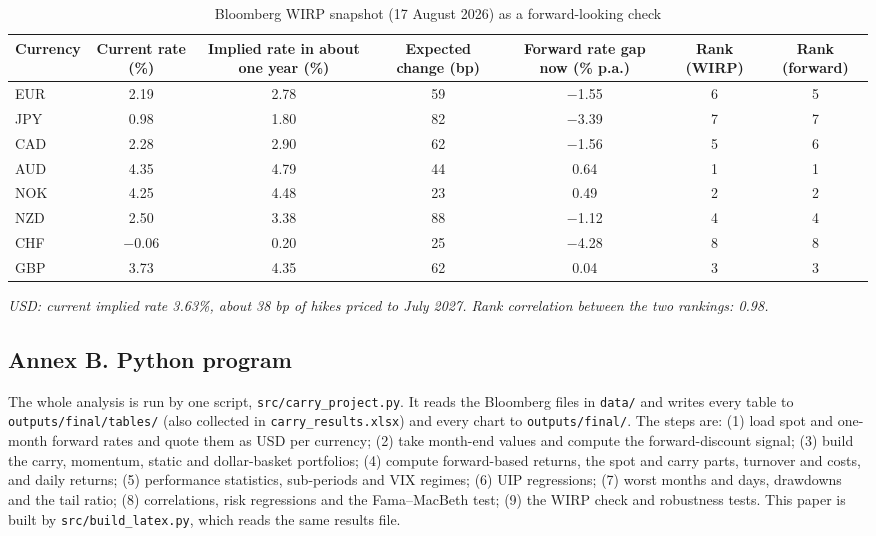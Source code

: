 \documentclass[11pt,a4paper]{article}
\begin{document}
\begin{table}[!htbp]\centering\small
\caption{Bloomberg WIRP snapshot (17 August 2026) as a forward-looking check}\label{tab:wirp}
\begin{tabularx}{\textwidth}{lCCCCCC}
\toprule Currency & Current rate (\%) & Implied rate in about one year (\%) & Expected change (bp) & Forward rate gap now (\% p.a.) & Rank (WIRP) & Rank (forward) \\ \midrule
EUR & 2.19 & 2.78 & 59 & $-$1.55 & 6 & 5 \\
JPY & 0.98 & 1.80 & 82 & $-$3.39 & 7 & 7 \\
CAD & 2.28 & 2.90 & 62 & $-$1.56 & 5 & 6 \\
AUD & 4.35 & 4.79 & 44 & 0.64 & 1 & 1 \\
NOK & 4.25 & 4.48 & 23 & 0.49 & 2 & 2 \\
NZD & 2.50 & 3.38 & 88 & $-$1.12 & 4 & 4 \\
CHF & $-$0.06 & 0.20 & 25 & $-$4.28 & 8 & 8 \\
GBP & 3.73 & 4.35 & 62 & 0.04 & 3 & 3 \\
\bottomrule\end{tabularx}
\par\vspace{0.3em}\footnotesize\emph{USD: current implied rate 3.63\%, about 38 bp of hikes priced to July 2027. Rank correlation between the two rankings: 0.98.}
\end{table}

\subsection*{Annex B. Python program}
The whole analysis is run by one script, \texttt{src/carry\_project.py}. It reads the Bloomberg files in \texttt{data/} and writes
every table to \texttt{outputs/final/tables/} (also collected in \texttt{carry\_results.xlsx}) and every chart to
\texttt{outputs/final/}. The steps are: (1) load spot and one-month forward rates and quote them as USD per currency;
(2) take month-end values and compute the forward-discount signal; (3) build the carry, momentum, static and dollar-basket
portfolios; (4) compute forward-based returns, the spot and carry parts, turnover and costs, and daily returns; (5) performance
statistics, sub-periods and VIX regimes; (6) UIP regressions; (7) worst months and days, drawdowns and the tail ratio;
(8) correlations, risk regressions and the Fama--MacBeth test; (9) the WIRP check and robustness tests. This paper is built by
\texttt{src/build\_latex.py}, which reads the same results file.
\end{document}
